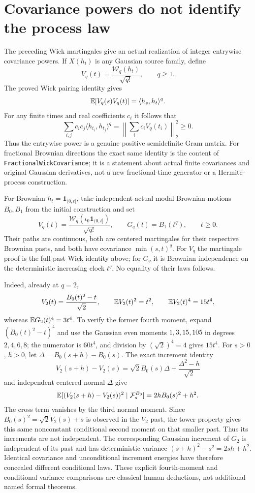 \documentclass[11pt]{article}
\newcommand{\code}[1]{{\small\nolinkurl{#1}}}
\begin{document}
\section{Covariance powers do not identify the process law}
The preceding Wick martingales give an actual realization of integer
entrywise covariance powers. If $X(h_t)$ is any Gaussian source
family, define
\[
 V_q(t)=\frac{\mathcal W_q(h_t)}{\sqrt{q!}},\qquad q\geq1.
\]
The proved Wick pairing identity gives
\[
 \mathbb E[V_q(s)V_q(t)]=\langle h_s,h_t\rangle^q.
\]
For any finite times and real coefficients $c_i$ it follows that
\[
 \sum_{i,j}c_ic_j\langle h_{t_i},h_{t_j}\rangle^q
 =\left\|\sum_i c_i V_q(t_i)\right\|_2^2\geq0.
\]
Thus the entrywise power is a genuine positive semidefinite Gram
matrix. For fractional Brownian directions the exact same identity
is the content of \code{FractionalWickCovariance}; it is a statement
about actual finite covariances and original Gaussian derivatives,
not a new fractional-time generator or a Hermite-process construction.

For Brownian $h_t=\mathbf1_{(0,t]}$, take independent actual modal
Brownian motions $B_0,B_1$ from the initial construction and set
\[
 V_q(t)=\frac{\mathcal W_q(\iota_0\mathbf1_{(0,t]})}{\sqrt{q!}},
 \qquad G_q(t)=B_1(t^q),\qquad t\geq0.
\]
Their paths are continuous, both are centered martingales for their
respective Brownian pasts, and both have covariance $\min(s,t)^q$.
For $V_q$ the martingale proof is the full-past Wick identity above;
for $G_q$ it is Brownian independence on the deterministic increasing
clock $t^q$. No equality of their laws follows.

Indeed, already at $q=2$,
\[
 V_2(t)=\frac{B_0(t)^2-t}{\sqrt2},\qquad
 \mathbb E V_2(t)^2=t^2,\qquad \mathbb E V_2(t)^4=15t^4,
\]
whereas $\mathbb E G_2(t)^4=3t^4$. To verify the former fourth moment,
expand $(B_0(t)^2-t)^4$ and use the Gaussian even moments
$1,3,15,105$ in degrees $2,4,6,8$; the numerator is $60t^4$,
and division by $(\sqrt2)^4=4$ gives $15t^4$.
For $s>0$, $h>0$, let $\Delta=B_0(s+h)-B_0(s)$.
The exact increment identity
\[
 V_2(s+h)-V_2(s)
 =\sqrt2 B_0(s)\Delta+\frac{\Delta^2-h}{\sqrt2}
\]
and independent centered normal $\Delta$ give
\[
 \mathbb E[(V_2(s+h)-V_2(s))^2\mid\mathcal F_s^{B_0}]
 =2h B_0(s)^2+h^2.
\]
The cross term vanishes by the third normal moment. Since
$B_0(s)^2=\sqrt2 V_2(s)+s$ is observed in the $V_2$ past,
the tower property gives this same nonconstant conditional second
moment on that smaller past. Thus its increments are not independent.
The corresponding Gaussian increment of $G_2$ is independent of its
past and has deterministic variance $(s+h)^2-s^2=2sh+h^2$.
Identical covariance and unconditional increment energies have
therefore concealed different conditional laws. These explicit
fourth-moment and conditional-variance comparisons are classical human
deductions, not additional named formal theorems.
\end{document}
